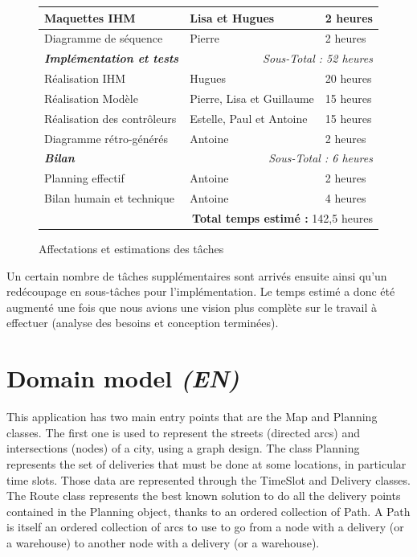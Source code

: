 \documentclass[paper=a4,fontsize=11pt]{report}
\numberwithin{equation}{section}		%
\numberwithin{figure}{section}		%
\numberwithin{table}{section}		%
\renewcommand{\bf}[1]{\textbf{#1}}
\renewcommand{\it}[1]{\textit{#1}}
\newcommand{\bfit}[1]{\textbf{\textit{#1}}}
\begin{document}
\begin{figure}[H]
\begin{center}
\begin{tabular}{  l  l  l  }
  \hline
  Maquettes IHM & Lisa et Hugues & 2 heures \\
  \hline
  Diagramme de séquence & Pierre & 2 heures \\
  \hline
  \hline
  \bfit{Implémentation et tests} & \multicolumn{2}{r}{\it{Sous-Total : 52 heures}} \\
  \hline
  Réalisation IHM & Hugues & 20 heures \\
  \hline
  Réalisation Modèle & Pierre, Lisa et Guillaume & 15 heures \\
  \hline
  Réalisation des contrôleurs & Estelle, Paul et Antoine & 15 heures \\
  \hline
  Diagramme rétro-générés & Antoine & 2 heures \\
  \hline
  \hline
  \bfit{Bilan} & \multicolumn{2}{r}{\it{Sous-Total : 6 heures}} \\
  \hline
  Planning effectif & Antoine & 2 heures \\
  \hline
  Bilan humain et technique & Antoine & 4 heures \\
  \hline
  \hline
  \multicolumn{3}{r}{\bf{Total temps estimé :} 142,5 heures} \\
  \hline
\end{tabular}
\end{center}
\caption{Affectations et estimations des tâches}
\end{figure}

Un certain nombre de tâches supplémentaires sont arrivés ensuite ainsi qu'un redécoupage en sous-tâches pour l'implémentation. Le temps estimé a donc été augmenté une fois que nous avions une vision plus complète sur le travail à effectuer (analyse des besoins et conception terminées).

\section{Domain model \it{(EN)}}
\label{sec:domain-model}

This application has two main entry points that are the Map and Planning classes. The first one is used to represent the streets (directed arcs) and intersections (nodes) of a city, using a graph design. The class Planning represents the set of deliveries that must be done at some locations, in particular time slots. Those data are represented through the TimeSlot and Delivery classes.\\

The Route class represents the best known solution to do all the delivery points contained in the Planning object, thanks to an ordered collection of Path. A Path is itself an ordered collection of arcs to use to go from a node with a delivery (or a warehouse) to another node with a delivery (or a warehouse).\\
\end{document}

